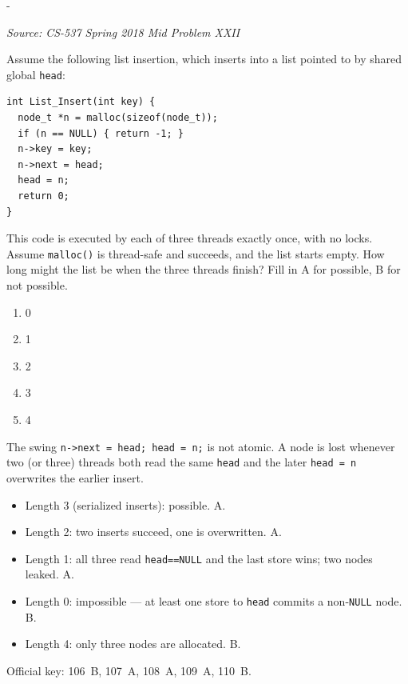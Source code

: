 \documentclass[11pt,a4paper]{article}
\makeatletter
\newcommand{\keepspace}[1]{\par\penalty-100\begingroup
  \setlength{\dimen@}{#1}\dimen@ii\pagegoal\advance\dimen@ii-\pagetotal
  \ifdim\dimen@>\dimen@ii\ifdim\dimen@ii>\z@\vfil\fi\break\fi\endgroup}
\newcounter{qn}[section]
\newenvironment{Qn}[4]{%
  \refstepcounter{qn}\keepspace{7\baselineskip}%
  \begin{tcolorbox}[qboxstyle, title={Q\thesection.\theqn\ \ [#1 \textbar\ #2]\ \ #4}]%
  {\footnotesize\color{g3}\textit{Source: #3}}\par\smallskip%
}{%
  \end{tcolorbox}%
}
\newenvironment{Sol}{%
  \begin{tcolorbox}[sboxstyle, title={Solution}]%
}{%
  \end{tcolorbox}\vspace{0.35em}%
}
\makeatother
\begin{document}
\begin{Qn}{Hard}{Lect 16--17}{CS-537 Spring 2018 Mid Problem XXII}{How long can a racy list become?}
Assume the following list insertion, which inserts into a list pointed to by shared global \texttt{head}:

\begin{lstlisting}[numbers=none]
int List_Insert(int key) {
  node_t *n = malloc(sizeof(node_t));
  if (n == NULL) { return -1; }
  n->key = key;
  n->next = head;
  head = n;
  return 0;
}
\end{lstlisting}

This code is executed by each of three threads exactly once, with no locks. Assume \texttt{malloc()} is thread-safe and succeeds, and the list starts empty. How long might the list be when the three threads finish? Fill in A for possible, B for not possible.

\begin{enumerate}
\item[106.] 0
\item[107.] 1
\item[108.] 2
\item[109.] 3
\item[110.] 4
\end{enumerate}
\end{Qn}
\begin{Sol}
The swing \texttt{n->next = head; head = n;} is not atomic. A node is lost whenever two (or three) threads both read the same \texttt{head} and the later \texttt{head = n} overwrites the earlier insert.

\begin{itemize}
\item Length 3 (serialized inserts): possible. A.
\item Length 2: two inserts succeed, one is overwritten. A.
\item Length 1: all three read \texttt{head==NULL} and the last store wins; two nodes leaked. A.
\item Length 0: impossible --- at least one store to \texttt{head} commits a non-\texttt{NULL} node. B.
\item Length 4: only three nodes are allocated. B.
\end{itemize}

Official key: 106~B, 107~A, 108~A, 109~A, 110~B.
\end{Sol}
\end{document}
